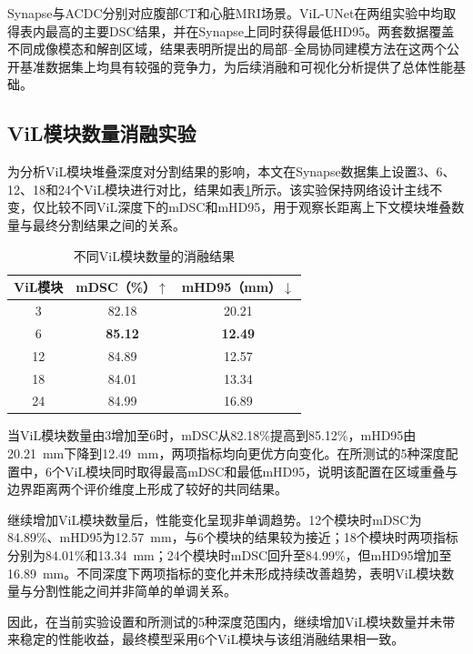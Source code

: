 Synapse与ACDC分别对应腹部CT和心脏MRI场景。ViL-UNet在两组实验中均取得表内最高的主要DSC结果，并在Synapse上同时获得最低HD95。两套数据覆盖不同成像模态和解剖区域，结果表明所提出的局部--全局协同建模方法在这两个公开基准数据集上均具有较强的竞争力，为后续消融和可视化分析提供了总体性能基础。


\subsection{ViL模块数量消融实验}

为分析ViL模块堆叠深度对分割结果的影响，本文在Synapse数据集上设置3、6、12、18和24个ViL模块进行对比，结果如表\ref{tab:ch3-vil-depth-ablation}所示。该实验保持网络设计主线不变，仅比较不同ViL深度下的mDSC和mHD95，用于观察长距离上下文模块堆叠数量与最终分割结果之间的关系。

\begin{table}[htbp]
  \centering
  \caption{不同ViL模块数量的消融结果}
  \label{tab:ch3-vil-depth-ablation}
  \begin{tabular}{ccc}
    \hline
    ViL模块 & mDSC（\%）$\uparrow$ & mHD95（mm）$\downarrow$ \\
    \hline
    3  & 82.18 & 20.21 \\
    6  & \textbf{85.12} & \textbf{12.49} \\
    12 & 84.89 & 12.57 \\
    18 & 84.01 & 13.34 \\
    24 & 84.99 & 16.89 \\
    \hline
  \end{tabular}
\end{table}

当ViL模块数量由3增加至6时，mDSC从82.18\%提高到85.12\%，mHD95由20.21~mm下降到12.49~mm，两项指标均向更优方向变化。在所测试的5种深度配置中，6个ViL模块同时取得最高mDSC和最低mHD95，说明该配置在区域重叠与边界距离两个评价维度上形成了较好的共同结果。

继续增加ViL模块数量后，性能变化呈现非单调趋势。12个模块时mDSC为84.89\%、mHD95为12.57~mm，与6个模块的结果较为接近；18个模块时两项指标分别为84.01\%和13.34~mm；24个模块时mDSC回升至84.99\%，但mHD95增加至16.89~mm。不同深度下两项指标的变化并未形成持续改善趋势，表明ViL模块数量与分割性能之间并非简单的单调关系。

因此，在当前实验设置和所测试的5种深度范围内，继续增加ViL模块数量并未带来稳定的性能收益，最终模型采用6个ViL模块与该组消融结果相一致。

